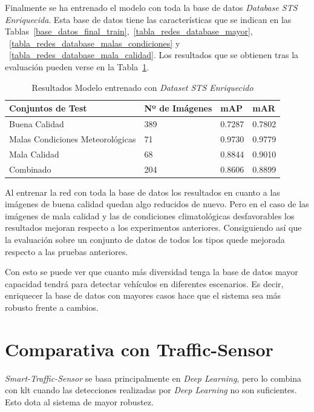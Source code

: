 Finalmente se ha entrenado el modelo con toda la base de datos \textit{Database STS Enriquecida}. Esta base de datos tiene las características que se indican en las Tablas~\ref{base_datos_final_train},~\ref{tabla_redes_database_mayor}, ~\ref{tabla_redes_database_malas_condiciones} y ~\ref{tabla_redes_database_mala_calidad}. Los resultados que se obtienen tras la evaluación pueden verse en la Tabla~\ref{resultados_test_todas_img}.

\begin{table}[H] 
\begin{center}
\begin{tabular}{|l|l|l|l|}
\hline
 Conjuntos de Test & Nº de Imágenes & mAP & mAR  \\ 
\hline \hline
Buena Calidad & 389 & 0.7287 & 0.7802 \\ \hline
Malas Condiciones Meteorológicas & 71 & 0.9730 & 0.9779 \\ \hline
Mala Calidad  & 68 & 0.8844 & 0.9010\\ \hline
Combinado & 204 & 0.8606 & 0.8899\\ \hline
\end{tabular}
\caption{Resultados Modelo entrenado con \textit{Dataset STS Enriquecido}}
\label{resultados_test_todas_img}
\end{center}
\end{table}

Al entrenar la red con toda la base de datos los resultados en cuanto a las imágenes de buena calidad quedan algo reducidos de nuevo. Pero en el caso de las imágenes de mala calidad y las de condiciones climatológicas desfavorables los resultados mejoran respecto  a los experimentos anteriores. Consiguiendo así que la evaluación sobre un conjunto de datos de todos los tipos quede mejorada respecto a las pruebas anteriores. 

Con esto se puede ver que cuanto más diversidad tenga la base de datos mayor capacidad tendrá para detectar vehículos en diferentes escenarios. Es decir, enriquecer la base de datos con mayores casos hace que el sistema sea más robusto frente a cambios. 

\section{Comparativa con Traffic-Sensor}

\textit{Smart-Traffic-Sensor} se basa principalmente en \textit{Deep Learning}, pero lo combina con \acrshort{klt} cuando las detecciones realizadas por \textit{Deep Learning} no son suficientes. Esto dota al sistema de mayor robustez. 

